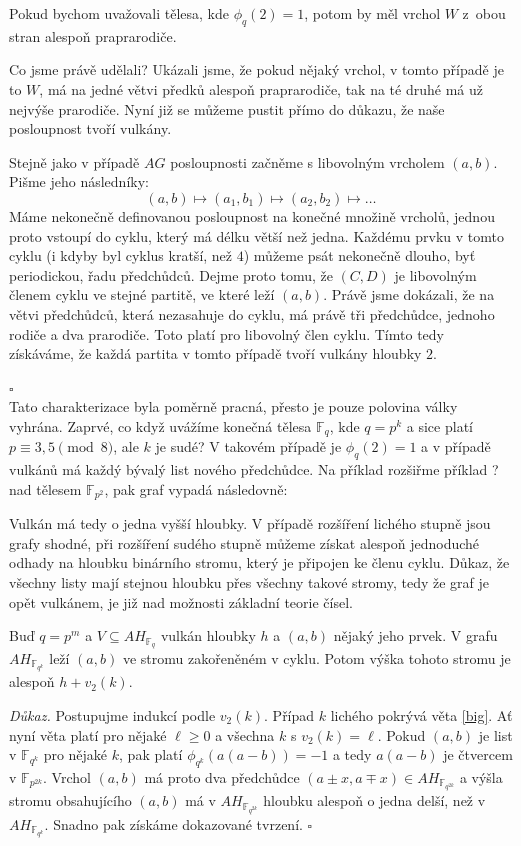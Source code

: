\documentclass[12pt]{report}
\begin{document}
\begin{poznamka}
Pokud bychom uvažovali tělesa, kde $\phi_q(2) =1$, potom by měl vrchol $W$ z~obou stran alespoň praprarodiče.
\end{poznamka}

Co jsme právě udělali? Ukázali jsme, že pokud nějaký vrchol, v tomto případě je to $W$, má na jedné větvi předků alespoň praprarodiče, tak na té druhé má už nejvýše prarodiče. Nyní již se můžeme pustit přímo do důkazu, že naše posloupnost tvoří vulkány.

Stejně jako v případě $AG$ posloupnosti začněme s libovolným vrcholem $(a,b)$. Pišme jeho následníky:
$$(a,b)\longmapsto (a_1,b_1)\longmapsto (a_2, b_2) \longmapsto \dots$$
Máme nekonečně definovanou posloupnost na konečné množině vrcholů, jednou proto vstoupí do cyklu, který má délku větší než jedna. Každému prvku v tomto cyklu (i kdyby byl cyklus kratší, než $4$) můžeme psát nekonečně dlouho, byť periodickou, řadu předchůdců. Dejme proto tomu, že $(C,D)$ je libovolným členem cyklu ve stejné partitě, ve které leží $(a,b)$. Právě jsme dokázali, že na větvi předchůdců, která nezasahuje do cyklu, má právě tři předchůdce, jednoho rodiče a dva prarodiče. Toto platí pro libovolný člen cyklu. Tímto tedy získáváme, že každá partita v tomto případě tvoří vulkány hloubky $2$.

 \hfill $\square$\\
 
Tato charakterizace byla poměrně pracná, přesto je pouze polovina války vyhrána. Zaprvé, co když uvážíme konečná tělesa $\mathbb{F}_q$, kde $q = p^k$ a sice platí $p \equiv 3,5 \pmod{8}$, ale $k$ je sudé? V takovém případě je $\phi_q(2)=1$ a v případě vulkánů má každý bývalý list nového předchůdce. Na příklad rozšiřme příklad ? nad tělesem $\mathbb{F}_{p^2}$, pak graf vypadá následovně:

Vulkán má tedy o jedna vyšší hloubky. V případě rozšíření lichého stupně jsou grafy shodné, při rozšíření sudého stupně můžeme získat alespoň jednoduché odhady na hloubku binárního stromu, který je připojen ke členu cyklu. Důkaz, že všechny listy mají stejnou hloubku přes všechny takové stromy, tedy že graf je opět vulkánem, je již nad možnosti základní teorie čísel. 

\begin{dusledek}
Buď $q = p^m$ a $V \subseteq AH_{\mathbb{F}_q}$ vulkán hloubky $h$ a $(a,b)$ nějaký jeho prvek. V grafu $AH_{\mathbb{F}_{q^k}}$ leží $(a,b)$ ve stromu zakořeněném v cyklu. Potom výška tohoto stromu je alespoň $h+v_2(k)$.
\end{dusledek}
\noindent \textit{Důkaz.} Postupujme indukcí podle $v_2(k)$. Případ $k$ lichého pokrývá věta \ref{big}. Ať nyní věta platí pro nějaké $\ell \geqslant 0$ a všechna $k$ s $v_2 (k) = \ell$. Pokud $(a,b)$ je list v $\mathbb{F}_{q^k}$ pro nějaké $k$, pak platí $\phi_{q^k} (a(a-b)) = -1$ a tedy $a(a-b)$ je čtvercem v $\mathbb{F}_{p^{2k}}$. Vrchol $(a,b)$ má proto dva předchůdce $(a\pm x,a\mp x) \in AH_{\mathbb{F}_{q^{2k}}}$  a výšla stromu obsahujícího $(a,b)$ má v $AH_{\mathbb{F}_{q^{2k}}}$ hloubku alespoň o jedna delší, než v $AH_{\mathbb{F}_{q^{k}}}$. Snadno pak získáme dokazované tvrzení. \hfill $\square$\\
\end{document}
